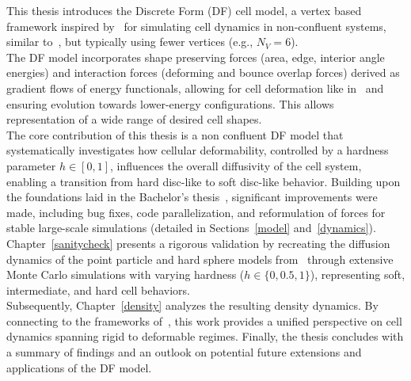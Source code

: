 This thesis introduces the Discrete Form (DF) cell model, a vertex based framework inspired by~\cite{Fletcher14, Boromand2018} for simulating cell dynamics in non-confluent systems, similar to~\cite{Boromand2018}, but typically using fewer vertices (e.g., $N_V=6$). \\
The DF model incorporates shape preserving forces (area, edge, interior angle energies) and interaction forces (deforming and bounce overlap forces) derived as gradient flows of energy functionals, allowing for cell deformation like in~\cite{Boromand2018, Fletcher14,wenzel2021,Happel2023} and ensuring evolution towards lower-energy configurations. 
This allows representation of a wide range of desired cell shapes. \\
The core contribution of this thesis is a non confluent DF model that systematically investigates how cellular deformability, controlled by a hardness parameter $h \in [0,1]$, influences the overall diffusivity of the cell system, enabling a transition from hard disc-like to soft disc-like behavior. 
Building upon the foundations laid in the Bachelor's thesis~\cite{Vogel2023}, significant improvements were made, including bug fixes, code parallelization, and reformulation of forces for stable large-scale simulations (detailed in Sections~\ref{model} and~\ref{dynamics}). \\
Chapter~\ref{sanitycheck} presents a rigorous validation by recreating the diffusion dynamics of the point particle and hard sphere models from~\cite{Bruna2012} through extensive Monte Carlo simulations with varying hardness ($h \in \{0, 0.5, 1\}$), representing soft, intermediate, and hard cell behaviors. \\
Subsequently, Chapter~\ref{density} analyzes the resulting density dynamics. 
By connecting to the frameworks of~\cite{Bruna2012, Bruna2017, Boromand2018}, this work provides a unified perspective on cell dynamics spanning rigid to deformable regimes. 
Finally, the thesis concludes with a summary of findings and an outlook on potential future extensions and applications of the DF model.
